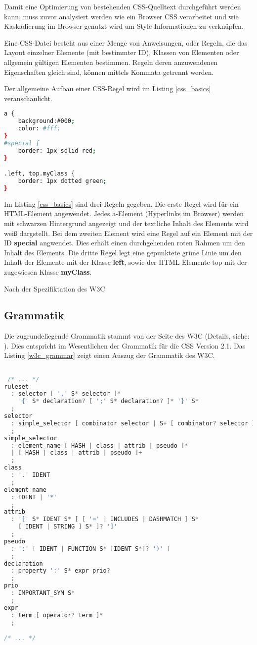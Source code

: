 Damit eine Optimierung von bestehenden CSS-Quelltext durchgeführt werden kann, muss zuvor analysiert werden wie ein Browser CSS verarbeitet und wie Kaskadierung im Browser genutzt wird um Style-Informationen zu verknüpfen.

Eine CSS-Datei besteht aus einer Menge von Anweisungen, oder Regeln, die das Layout einzelner Elemente (mit bestimmter ID), Klassen von Elementen oder allgemein gültigen Elementen bestimmen. Regeln deren anzuwendenen Eigenschaften gleich sind, können mittels Kommata getrennt werden.

Der allgemeine Aufbau einer CSS-Regel wird im Listing \ref{css_basics} veranschaulicht.   
\begin{lstlisting}[label=css_basics,language=bash, caption=Aufbau einer CSS-Regel]
a {
    background:#000;
    color: #fff;
}  
#special {
    border: 1px solid red;
}

.left, top.myClass {
    border: 1px dotted green;
}
\end{lstlisting}

Im Listing \ref{css_basics} sind drei Regeln gegeben. Die erste Regel wird für ein HTML-Element angewendet. Jedes a-Element (Hyperlinks im Browser) werden mit schwarzen Hintergrund angezeigt und der textliche Inhalt des Elements wird weiß dargstellt. Bei dem zweiten Element wird eine Regel auf ein Element mit der ID \textbf{special} angwendet. Dies erhält einen durchgehenden roten Rahmen um den Inhalt des Elements. Die dritte Regel legt eine gepunktete grüne Linie um den Inhalt der Elemente mit der Klasse \textbf{left}, sowie der HTML-Elemente top mit der zugewiesen Klasse \textbf{myClass}.  



Nach der Spezifiktation des W3C
\subsection{Grammatik}
Die zugrundeliegende Grammatik stammt von der Seite des W3C (Details, siehe: \cite{w3c_css_grammar}). Dies entspricht im Wesentlichen der Grammatik für die CSS Version 2.1. Das Listing \ref{w3c_grammar} zeigt einen Auszug der Grammatik des W3C. 

\begin{lstlisting}[label=w3c_grammar,language=C, caption=Grammatik des W3C]

 /* ... */
ruleset
  : selector [ ',' S* selector ]*
    '{' S* declaration? [ ';' S* declaration? ]* '}' S*
  ;
selector
  : simple_selector [ combinator selector | S+ [ combinator? selector ]? ]?
  ;
simple_selector
  : element_name [ HASH | class | attrib | pseudo ]*
  | [ HASH | class | attrib | pseudo ]+
  ;
class
  : '.' IDENT
  ;
element_name
  : IDENT | '*'
  ;
attrib
  : '[' S* IDENT S* [ [ '=' | INCLUDES | DASHMATCH ] S*
    [ IDENT | STRING ] S* ]? ']'
  ;
pseudo
  : ':' [ IDENT | FUNCTION S* [IDENT S*]? ')' ]
  ;
declaration
  : property ':' S* expr prio?
  ;
prio
  : IMPORTANT_SYM S*
  ;
expr
  : term [ operator? term ]*
  ;

/* ... */

\end{lstlisting}

